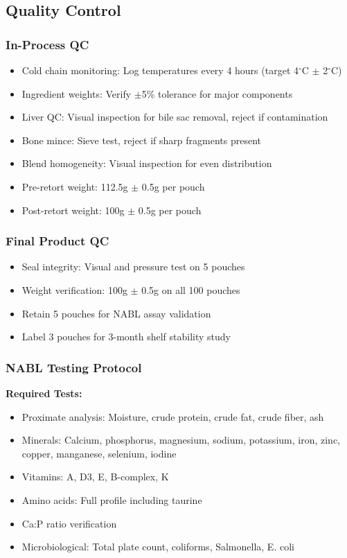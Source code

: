 \subsection*{Quality Control}

\subsubsection*{In-Process QC}
\begin{itemize}
\item Cold chain monitoring: Log temperatures every 4 hours (target 4$^\circ$C $\pm$ 2$^\circ$C)
\item Ingredient weights: Verify $\pm$5\% tolerance for major components
\item Liver QC: Visual inspection for bile sac removal, reject if contamination
\item Bone mince: Sieve test, reject if sharp fragments present
\item Blend homogeneity: Visual inspection for even distribution
\item Pre-retort weight: 112.5g $\pm$ 0.5g per pouch
\item Post-retort weight: 100g $\pm$ 0.5g per pouch
\end{itemize}

\subsubsection*{Final Product QC}
\begin{itemize}
\item Seal integrity: Visual and pressure test on 5 pouches
\item Weight verification: 100g $\pm$ 0.5g on all 100 pouches
\item Retain 5 pouches for NABL assay validation
\item Label 3 pouches for 3-month shelf stability study
\end{itemize}

\subsubsection*{NABL Testing Protocol}
\textbf{Required Tests:}
\begin{itemize}
\item Proximate analysis: Moisture, crude protein, crude fat, crude fiber, ash
\item Minerals: Calcium, phosphorus, magnesium, sodium, potassium, iron, zinc, copper, manganese, selenium, iodine
\item Vitamins: A, D3, E, B-complex, K
\item Amino acids: Full profile including taurine
\item Ca:P ratio verification
\item Microbiological: Total plate count, coliforms, Salmonella, E. coli
\end{itemize}

